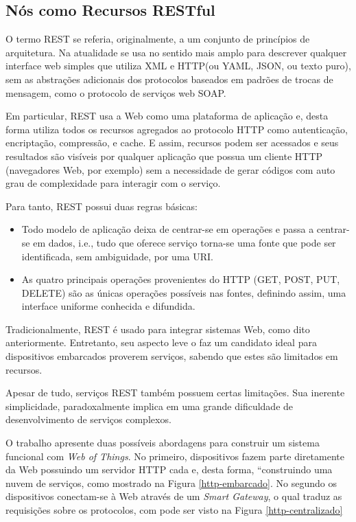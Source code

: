 \documentclass[12pt,a4paper,oneside]{report}
\begin{document}
\subsection{Nós como Recursos RESTful}

O termo REST se referia, originalmente, a um conjunto de princípios de arquitetura. Na atualidade se usa no sentido mais amplo para descrever qualquer interface web simples que utiliza XML e HTTP(ou YAML, JSON, ou texto puro), sem as abstrações adicionais dos protocolos baseados em padrões de trocas de mensagem, como o protocolo de serviços web SOAP. 

Em particular, REST usa a Web como uma plataforma de aplicação e, desta forma utiliza todos os recursos agregados ao protocolo HTTP como autenticação, encriptação, compressão, e cache. E assim, recursos podem ser acessados e seus resultados são visíveis por qualquer aplicação que possua um cliente HTTP (navegadores Web, por exemplo) sem a necessidade de gerar códigos com auto grau de complexidade para interagir com o serviço. 

Para tanto, REST possui duas regras básicas: 
\begin{itemize}
  \item Todo modelo de aplicação deixa de centrar-se em operações e passa a centrar-se em dados, i.e., tudo que oferece serviço torna-se uma fonte que pode ser identificada, sem ambiguidade, por uma URI. 
  \item As quatro principais operações provenientes do HTTP (GET, POST, PUT, DELETE) são as únicas operações possíveis nas fontes, definindo assim, uma interface uniforme conhecida e difundida. 
\end{itemize}

Tradicionalmente, REST é usado para integrar sistemas Web, como dito anteriormente. Entretanto, seu aspecto leve o faz um candidato ideal para dispositivos embarcados proverem serviços, sabendo que estes são limitados em recursos.

Apesar de tudo, serviços REST também possuem certas limitações. Sua inerente simplicidade, paradoxalmente implica em uma grande dificuldade de desenvolvimento de serviços complexos.

O trabalho \cite{wotdovad} apresente duas possíveis abordagens para construir um sistema funcional com \emph{Web of Things}. No primeiro, dispositivos fazem parte diretamente da Web possuindo um servidor HTTP cada e, desta forma, ``construindo uma nuvem de serviços, como mostrado na Figura \ref{http-embarcado}. No segundo os dispositivos conectam-se à Web através de um \emph{Smart Gateway}, o qual traduz as requisições sobre os protocolos, com pode ser visto na Figura \ref{http-centralizado}
\end{document}
